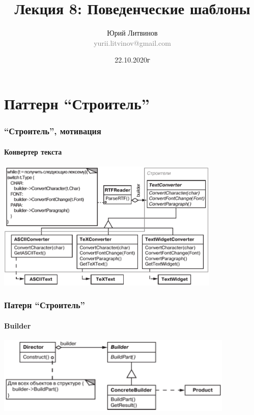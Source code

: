 \documentclass[xetex,mathserif,serif]{beamer}
\title[Шаблоны]{Лекция 8: Поведенческие шаблоны}
\author[Юрий Литвинов]{Юрий Литвинов\\\small{\textcolor{gray}{yurii.litvinov@gmail.com}}}
\date{22.10.2020г}
\begin{document}
    \frame{\titlepage}

    \section{Паттерн ``Строитель''}

    \begin{frame}
        \frametitle{``Строитель'', мотивация}
        \framesubtitle{Конвертер текста}
        \begin{center}
            \includegraphics[width=0.8\textwidth]{textConverter.png}
        \end{center}
    \end{frame}

    \begin{frame}
        \frametitle{Патерн ``Строитель''}
        \framesubtitle{Builder}
        \begin{center}
            \includegraphics[width=0.85\textwidth]{builder.png}
        \end{center}
    \end{frame}
    
\end{document}

